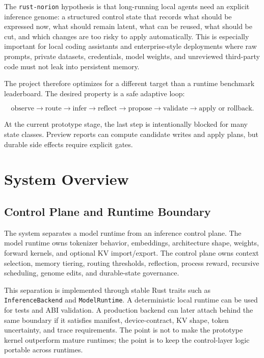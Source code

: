 \documentclass[10pt]{article}
\begin{document}
The \texttt{rust-norion} hypothesis is that long-running local agents need an
explicit inference genome: a structured control state that records what should
be expressed now, what should remain latent, what can be reused, what should be
cut, and which changes are too risky to apply automatically. This is especially
important for local coding assistants and enterprise-style deployments where
raw prompts, private datasets, credentials, model weights, and unreviewed
third-party code must not leak into persistent memory.

The project therefore optimizes for a different target than a runtime benchmark
leaderboard. The desired property is a safe adaptive loop:

\[
  \text{observe} \rightarrow \text{route} \rightarrow \text{infer}
  \rightarrow \text{reflect} \rightarrow \text{propose}
  \rightarrow \text{validate} \rightarrow \text{apply or rollback}.
\]

At the current prototype stage, the last step is intentionally blocked for many
state classes. Preview reports can compute candidate writes and apply plans,
but durable side effects require explicit gates.

\section{System Overview}

\subsection{Control Plane and Runtime Boundary}

The system separates a model runtime from an inference control plane. The model
runtime owns tokenizer behavior, embeddings, architecture shape, weights,
forward kernels, and optional KV import/export. The control plane owns context
selection, memory tiering, routing thresholds, reflection, process reward,
recursive scheduling, genome edits, and durable-state governance.

This separation is implemented through stable Rust traits such as
\texttt{InferenceBackend} and \texttt{ModelRuntime}. A deterministic local
runtime can be used for tests and ABI validation. A production backend can later
attach behind the same boundary if it satisfies manifest, device-contract, KV
shape, token uncertainty, and trace requirements. The point is not to make the
prototype kernel outperform mature runtimes; the point is to keep the
control-layer logic portable across runtimes.
\end{document}
